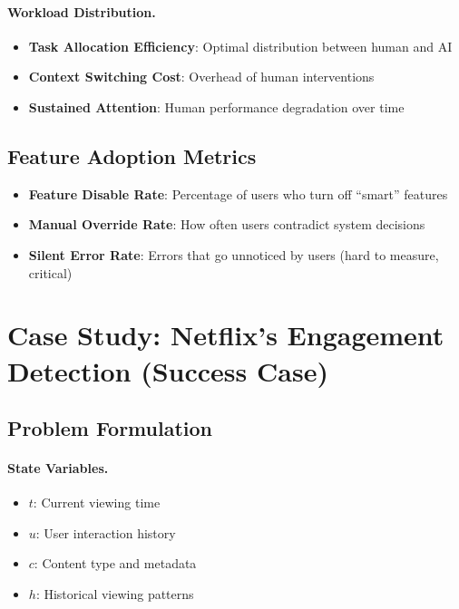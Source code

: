 \paragraph{Workload Distribution.}
\begin{itemize}
    \item \textbf{Task Allocation Efficiency}: Optimal distribution between human and AI
    \item \textbf{Context Switching Cost}: Overhead of human interventions
    \item \textbf{Sustained Attention}: Human performance degradation over time
\end{itemize}

\subsection{Feature Adoption Metrics}

\begin{keyconcept}
\begin{itemize}
    \item \textbf{Feature Disable Rate}: Percentage of users who turn off ``smart'' features
    \item \textbf{Manual Override Rate}: How often users contradict system decisions
    \item \textbf{Silent Error Rate}: Errors that go unnoticed by users (hard to measure, critical)
\end{itemize}
\end{keyconcept}

\section{Case Study: Netflix's Engagement Detection (Success Case)}

\subsection{Problem Formulation}

\paragraph{State Variables.}
\begin{itemize}
    \item $t$: Current viewing time
    \item $u$: User interaction history
    \item $c$: Content type and metadata
    \item $h$: Historical viewing patterns
\end{itemize}

